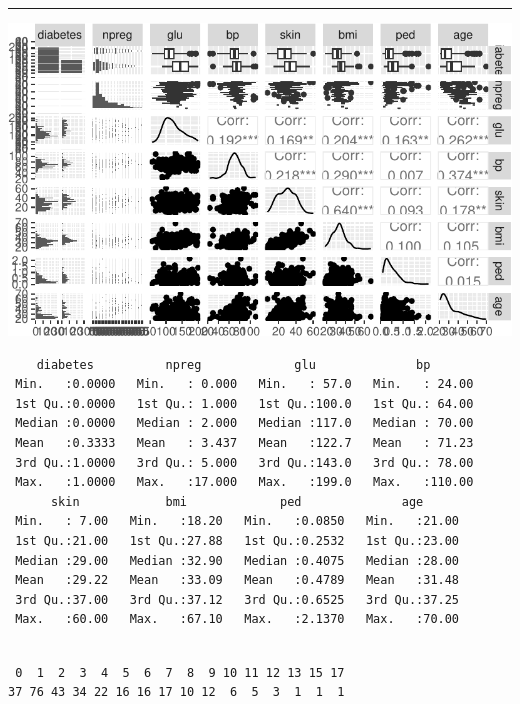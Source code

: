 \documentclass[
  letterpaper,
  DIV=11,
  numbers=noendperiod]{scrartcl}
\begin{document}
\begin{center}\rule{0.5\linewidth}{0.5pt}\end{center}

\includegraphics{L13_files/figure-pdf/unnamed-chunk-13-1.pdf}

\begin{verbatim}
    diabetes          npreg             glu              bp        
 Min.   :0.0000   Min.   : 0.000   Min.   : 57.0   Min.   : 24.00  
 1st Qu.:0.0000   1st Qu.: 1.000   1st Qu.:100.0   1st Qu.: 64.00  
 Median :0.0000   Median : 2.000   Median :117.0   Median : 70.00  
 Mean   :0.3333   Mean   : 3.437   Mean   :122.7   Mean   : 71.23  
 3rd Qu.:1.0000   3rd Qu.: 5.000   3rd Qu.:143.0   3rd Qu.: 78.00  
 Max.   :1.0000   Max.   :17.000   Max.   :199.0   Max.   :110.00  
      skin            bmi             ped              age       
 Min.   : 7.00   Min.   :18.20   Min.   :0.0850   Min.   :21.00  
 1st Qu.:21.00   1st Qu.:27.88   1st Qu.:0.2532   1st Qu.:23.00  
 Median :29.00   Median :32.90   Median :0.4075   Median :28.00  
 Mean   :29.22   Mean   :33.09   Mean   :0.4789   Mean   :31.48  
 3rd Qu.:37.00   3rd Qu.:37.12   3rd Qu.:0.6525   3rd Qu.:37.25  
 Max.   :60.00   Max.   :67.10   Max.   :2.1370   Max.   :70.00  
\end{verbatim}

\begin{verbatim}

 0  1  2  3  4  5  6  7  8  9 10 11 12 13 15 17 
37 76 43 34 22 16 16 17 10 12  6  5  3  1  1  1 
\end{verbatim}
\end{document}
